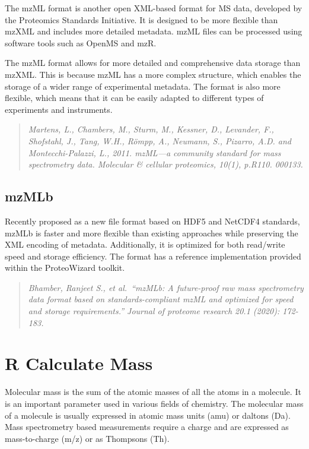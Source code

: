 \documentclass[
]{book}
\begin{document}
The mzML format is another open XML-based format for MS data, developed by the Proteomics Standards Initiative. It is designed to be more flexible than mzXML and includes more detailed metadata. mzML files can be processed using software tools such as OpenMS and mzR.

The mzML format allows for more detailed and comprehensive data storage than mzXML. This is because mzML has a more complex structure, which enables the storage of a wider range of experimental metadata. The format is also more flexible, which means that it can be easily adapted to different types of experiments and instruments.

\begin{quote}
\emph{Martens, L., Chambers, M., Sturm, M., Kessner, D., Levander, F., Shofstahl, J., Tang, W.H., Römpp, A., Neumann, S., Pizarro, A.D. and Montecchi-Palazzi, L., 2011. mzML---a community standard for mass spectrometry data. Molecular \& cellular proteomics, 10(1), p.R110. 000133.}
\end{quote}

\hypertarget{mzmlb}{%
\subsection*{mzMLb}\label{mzmlb}}

Recently proposed as a new file format based on HDF5 and NetCDF4 standards, mzMLb is faster and more flexible than existing approaches while preserving the XML encoding of metadata. Additionally, it is optimized for both read/write speed and storage efficiency. The format has a reference implementation provided within the ProteoWizard toolkit.

\begin{quote}
\emph{Bhamber, Ranjeet S., et al.~``mzMLb: A future-proof raw mass spectrometry data format based on standards-compliant mzML and optimized for speed and storage requirements.'' Journal of proteome research 20.1 (2020): 172-183.}
\end{quote}

\hypertarget{r-calculate-mass}{%
\section{R Calculate Mass}\label{r-calculate-mass}}

Molecular mass is the sum of the atomic masses of all the atoms in a molecule. It is an important parameter used in various fields of chemistry. The molecular mass of a molecule is usually expressed in atomic mass units (amu) or daltons (Da). Mass spectrometry based measurements require a charge and are expressed as mass-to-charge (m/z) or as Thompsons (Th).
\end{document}
